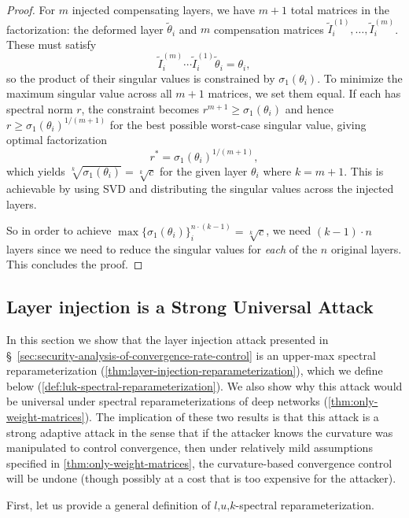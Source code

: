 \documentclass{article}
\theoremstyle{plain}
\theoremstyle{definition}
\theoremstyle{remark}
\begin{document}
\begin{proof}
For $m$ injected compensating layers, we have $m+1$ total matrices in the factorization: the deformed layer $\tilde{\theta}_i$ and $m$ compensation matrices $\tilde{I}_i^{(1)}, \dots, \tilde{I}_i^{(m)}$. These must satisfy
\[
\tilde{I}_i^{(m)} \cdots \tilde{I}_i^{(1)} \tilde{\theta}_i = \theta_i,
\]
so the product of their singular values is constrained by $\sigma_1(\theta_i)$. To minimize the maximum singular value across all $m+1$ matrices, we set them equal. If each has spectral norm $r$, the constraint becomes $r^{m+1} \ge \sigma_1(\theta_i)$ and hence $r \ge \sigma_1(\theta_i)^{1/(m+1)}$ for the best possible worst-case singular value, giving optimal factorization
\[
r^* = \sigma_1(\theta_i)^{1/(m+1)},
\]
which yields $\sqrt[k]{\sigma_1(\theta_i)} = \sqrt[k]{c}$ for the given layer $\theta_i$ where $k = m + 1$. This is achievable by using SVD and distributing the singular values across the injected layers.

 So in order to achieve $\max\{\sigma_1(\theta_i)\}_i^{n \cdot (k - 1)} = \sqrt[k]{c}$, we need $(k - 1) \cdot n$ layers since we need to reduce the singular values for \textit{each} of the $n$ original layers.  This concludes the proof.
\end{proof}

\subsection{Layer injection is a Strong Universal Attack}
\label{app:layer-injection-is-universal}
In this section we show that the layer injection attack presented in \S~\ref{sec:security-analysis-of-convergence-rate-control} is an upper-max spectral reparameterization (\cref{thm:layer-injection-reparameterization}), which we define below (\cref{def:luk-spectral-reparameterization}). We also show why this attack would be universal under spectral reparameterizations of deep networks (\cref{thm:only-weight-matrices}). The implication of these two results is that this attack is a strong adaptive attack in the sense that if the attacker knows the curvature was manipulated to control convergence, then under relatively mild assumptions specified in \cref{thm:only-weight-matrices}, the curvature-based convergence control will be undone (though possibly at a cost that is too expensive for the attacker).

First, let us provide a general definition of $l$,$u$,$k$-spectral reparameterization.
 
\end{document}
